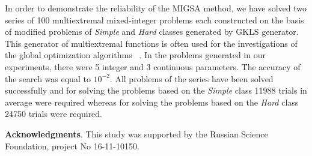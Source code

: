 \documentclass{llncs}
\begin{document}
In order to demonstrate the reliability of the MIGSA method, we have solved two series of 100 
multiextremal mixed-integer problems each constructed on the basis of modified problems of 
\textit{Simple} and \textit{Hard} classes generated by GKLS generator. %
This generator of multiextremal functions is often used for the investigations of the global optimization algorithms~ 
\cite{Paulavicius2014,SergeyevKvasov2015,Lebedev2015,Gergel2015}.
In the problems generated in our experiments, there were 5 integer  and 3 continuous parameters.
The accuracy of the search %
was equal to $10^{-2}$. All  
problems of the series have been solved successfully and for solving the problems based on 
the \textit{Simple} class 11988 trials in average were required whereas for solving the problems based 
on the \textit{Hard} class 24750 trials were required.


\textbf{Acknowledgments}. This study was supported by the Russian Science Foundation, project No 16-11-10150.
\end{document}
